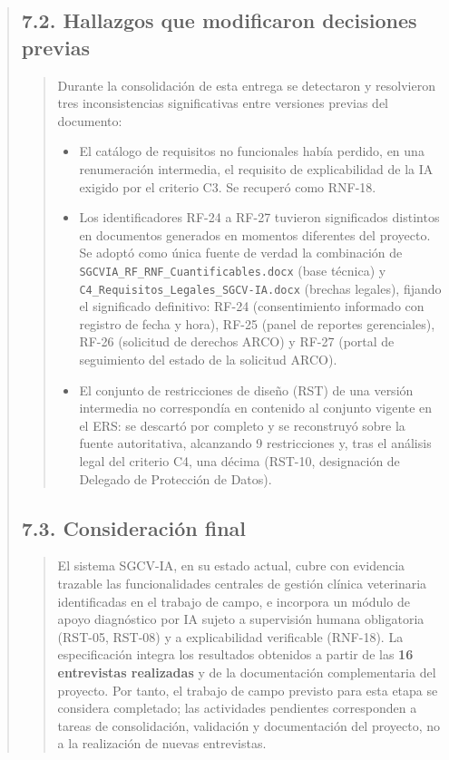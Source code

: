 \documentclass[
]{article}
\begin{document}
\begin{quote}
\subsection{7.2. Hallazgos que modificaron decisiones
previas}\label{s7-2-hallazgos-que-modificaron-decisiones-previas}
\begin{quote}
Durante la consolidación de esta entrega se detectaron y resolvieron
tres inconsistencias significativas entre versiones previas del
documento:
\begin{itemize}
  \item El catálogo de requisitos no funcionales había perdido, en una
  renumeración intermedia, el requisito de explicabilidad de la IA
  exigido por el criterio C3. Se recuperó como RNF-18.
  \item Los identificadores RF-24 a RF-27 tuvieron significados
  distintos en documentos generados en momentos diferentes del
  proyecto. Se adoptó como única fuente de verdad la combinación de
  \texttt{SGCVIA\_RF\_RNF\_Cuantificables.docx} (base técnica) y
  \texttt{C4\_Requisitos\_Legales\_SGCV-IA.docx} (brechas legales),
  fijando el significado definitivo: RF-24 (consentimiento informado
  con registro de fecha y hora), RF-25 (panel de reportes gerenciales),
  RF-26 (solicitud de derechos ARCO) y RF-27 (portal de seguimiento del
  estado de la solicitud ARCO).
  \item El conjunto de restricciones de diseño (RST) de una versión
  intermedia no correspondía en contenido al conjunto vigente en el
  ERS: se descartó por completo y se reconstruyó sobre la fuente
  autoritativa, alcanzando 9 restricciones y, tras el análisis legal
  del criterio C4, una décima (RST-10, designación de Delegado de
  Protección de Datos).
\end{itemize}
\end{quote}
\subsection{7.3. Consideración final}\label{s7-6-consideracion-final}
\begin{quote}
El sistema SGCV-IA, en su estado actual, cubre con evidencia trazable
las funcionalidades centrales de gestión clínica veterinaria
identificadas en el trabajo de campo, e incorpora un módulo de apoyo
diagnóstico por IA sujeto a supervisión humana obligatoria (RST-05,
RST-08) y a explicabilidad verificable (RNF-18). La especificación integra los resultados obtenidos a partir de las
\textbf{16 entrevistas realizadas} y de la documentación complementaria
del proyecto. Por tanto, el trabajo de campo previsto para esta etapa
se considera completado; las actividades pendientes corresponden a
tareas de consolidación, validación y documentación del proyecto, no a
la realización de nuevas entrevistas.
\end{quote}

\end{quote}
\end{document}
